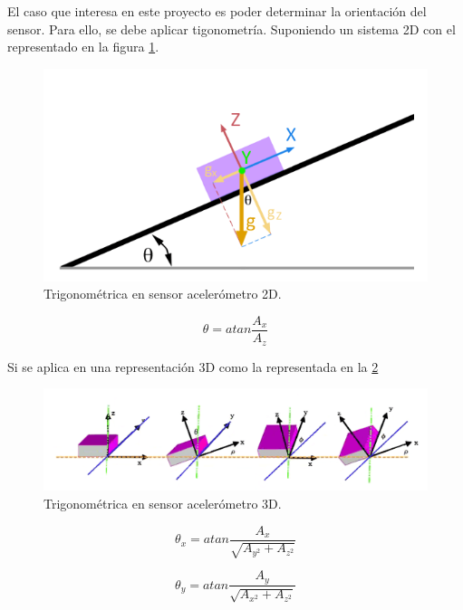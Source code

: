 El caso que interesa en este proyecto es poder determinar la orientación del sensor. Para ello, se debe aplicar tigonometría. Suponiendo un sistema 2D con el representado en la figura \ref{fig:acelerometro1}.

\begin{figure}[H]
	\center
	\includegraphics[scale=0.4]{imagenes/Balancing_robot/acelerometro1}
	\caption{Trigonométrica en sensor acelerómetro 2D.}
	\label{fig:acelerometro1}
\end{figure}

\begin{equation}
\theta = atan\frac{A_{x}}{A_{z}}
\end{equation}

Si se aplica en una representación 3D como la representada en la \ref{fig:acelerometro2}

\begin{figure}[H]
	\center
	\includegraphics[scale=0.6]{imagenes/Balancing_robot/acelerometro2}
	\caption{Trigonométrica en sensor acelerómetro 3D.}
	\label{fig:acelerometro2}
\end{figure}

\begin{equation}
\theta_{x} = atan\frac{A_{x}}{\sqrt{A_{y^2}+A_{z^2}}}
\end{equation}

\begin{equation}
\theta_{y} = atan\frac{A_{y}}{\sqrt{A_{x^2}+A_{z^2}}}
\end{equation}

